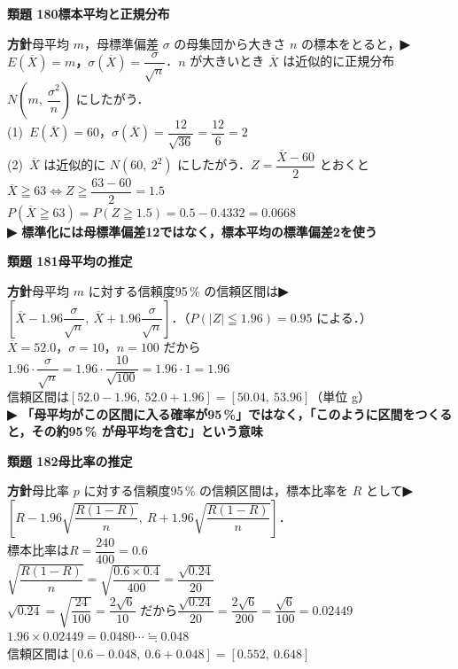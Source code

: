 \documentclass[a4paper,11pt]{ltjsarticle}
\newcommand{\ans}[2]{\Needspace{5\baselineskip}\vspace{6pt}%
  {\sffamily\bfseries 類題 #1\quad #2}\par}
\newcommand{\point}[1]{\textsf{\bfseries ▶ #1}}
\begin{document}
\ans{180}{標本平均と正規分布}
\begin{kai}
\textbf{方針}\quad 母平均 $m$，母標準偏差 $\sigma$ の母集団から大きさ $n$ の標本をとると，\point{$E(\overline X)=m$，$\sigma(\overline X)=\dfrac{\sigma}{\sqrt n}$}．$n$ が大きいとき $\overline X$ は近似的に正規分布 $N\left(m,\ \dfrac{\sigma^2}n\right)$ にしたがう．\\[2pt]
(1)\ $E(\overline X)=60$，\quad $\sigma(\overline X)=\dfrac{12}{\sqrt{36}}=\dfrac{12}{6}=2$\\[2pt]
(2)\ $\overline X$ は近似的に $N(60,\ 2^2)$ にしたがう．$Z=\dfrac{\overline X-60}2$ とおくと\\
\hspace*{1.5em}$\overline X\geqq63\iff Z\geqq\dfrac{63-60}2=1.5$\\
\hspace*{1.5em}$P(\overline X\geqq63)=P(Z\geqq1.5)=0.5-0.4332=0.0668$\\
\hspace*{1.5em}\point{標準化には母標準偏差12ではなく，標本平均の標準偏差2を使う}
\end{kai}

\ans{181}{母平均の推定}
\begin{kai}
\textbf{方針}\quad 母平均 $m$ に対する信頼度95\,\% の信頼区間は\point{$\left[\overline X-1.96\dfrac{\sigma}{\sqrt n},\ \overline X+1.96\dfrac{\sigma}{\sqrt n}\right]$}．（$P(|Z|\leqq1.96)=0.95$ による．）\\[2pt]
$\overline X=52.0$，$\sigma=10$，$n=100$ だから\\
\hspace*{1.5em}$1.96\cdot\dfrac{\sigma}{\sqrt n}=1.96\cdot\dfrac{10}{\sqrt{100}}=1.96\cdot1=1.96$\\[2pt]
信頼区間は\quad $[52.0-1.96,\ 52.0+1.96]=[50.04,\ 53.96]$（単位 g）\\
\point{「母平均がこの区間に入る確率が95\,\%」ではなく，「このように区間をつくると，その約95\,\% が母平均を含む」という意味}
\end{kai}

\ans{182}{母比率の推定}
\begin{kai}
\textbf{方針}\quad 母比率 $p$ に対する信頼度95\,\% の信頼区間は，標本比率を $R$ として\point{$\left[R-1.96\sqrt{\dfrac{R(1-R)}n},\ R+1.96\sqrt{\dfrac{R(1-R)}n}\right]$}．\\[2pt]
標本比率は\quad $R=\dfrac{240}{400}=0.6$\\
$\sqrt{\dfrac{R(1-R)}n}=\sqrt{\dfrac{0.6\times0.4}{400}}=\dfrac{\sqrt{0.24}}{20}$\\
$\sqrt{0.24}=\sqrt{\dfrac{24}{100}}=\dfrac{2\sqrt6}{10}$ だから\quad $\dfrac{\sqrt{0.24}}{20}=\dfrac{2\sqrt6}{200}=\dfrac{\sqrt6}{100}=0.02449$\\[2pt]
$1.96\times0.02449=0.0480\cdots\fallingdotseq0.048$\\
信頼区間は\quad $[0.6-0.048,\ 0.6+0.048]=[0.552,\ 0.648]$
\end{kai}
\end{document}
